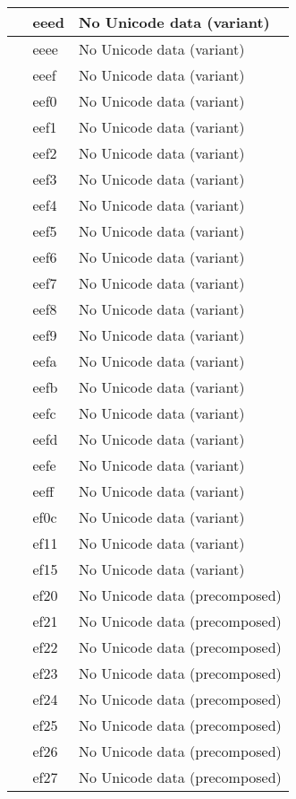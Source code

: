 \documentclass[12pt,letterpaper,openany]{book}
\begin{document}
\begin{center}
\begin{supertabular}{|m{0.25in}|m{0.5in}|m{4in}|}
			 & eeed & No Unicode data (variant)\\\hline
			 & eeee & No Unicode data (variant)\\\hline
			 & eeef & No Unicode data (variant)\\\hline
			 & eef0 & No Unicode data (variant)\\\hline
			 & eef1 & No Unicode data (variant)\\\hline
			 & eef2 & No Unicode data (variant)\\\hline
			 & eef3 & No Unicode data (variant)\\\hline
			 & eef4 & No Unicode data (variant)\\\hline
			 & eef5 & No Unicode data (variant)\\\hline
			 & eef6 & No Unicode data (variant)\\\hline
			 & eef7 & No Unicode data (variant)\\\hline
			 & eef8 & No Unicode data (variant)\\\hline
			 & eef9 & No Unicode data (variant)\\\hline
			 & eefa & No Unicode data (variant)\\\hline
			 & eefb & No Unicode data (variant)\\\hline
			 & eefc & No Unicode data (variant)\\\hline
			 & eefd & No Unicode data (variant)\\\hline
			 & eefe & No Unicode data (variant)\\\hline
			 & eeff & No Unicode data (variant)\\\hline
			 & ef0c & No Unicode data (variant)\\\hline
			 & ef11 & No Unicode data (variant)\\\hline
			 & ef15 & No Unicode data (variant)\\\hline
			 & ef20 & No Unicode data (precomposed)\\\hline
			 & ef21 & No Unicode data (precomposed)\\\hline
			 & ef22 & No Unicode data (precomposed)\\\hline
			 & ef23 & No Unicode data (precomposed)\\\hline
			 & ef24 & No Unicode data (precomposed)\\\hline
			 & ef25 & No Unicode data (precomposed)\\\hline
			 & ef26 & No Unicode data (precomposed)\\\hline
			 & ef27 & No Unicode data (precomposed)\\\hline

\end{supertabular}
\end{center}
\end{document}

